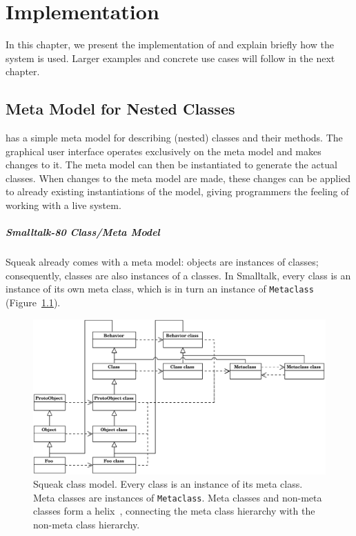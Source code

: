 \chapter{Implementation}
\label{sec:impl}
In this chapter, we present the implementation of \msname and explain briefly how the system is used. Larger examples and concrete use cases will follow in the next chapter.

\section{Meta Model for Nested Classes}
\label{sec:impl_meta_model}
\msname has a simple meta model for describing (nested) classes and their methods. The graphical user interface operates exclusively on the meta model and makes changes to it. The meta model can then be instantiated to generate the actual classes. When changes to the meta model are made, these changes can be applied to already existing instantiations of the model, giving programmers the feeling of working with a live system.

\paragraph{Smalltalk-80 Class/Meta Model}
Squeak already comes with a meta model: objects are instances of classes; consequently, classes are also instances of a classes. In Smalltalk, every class is an instance of its own meta class, which is in turn an instance of \texttt{Metaclass} (Figure~\ref{fig:impl_squeak_meta}).

\begin{figure}
	\includegraphics[width=\textwidth]{squeak_meta.pdf}
	\centering
	\caption[Squeak class model]{Squeak class model. Every class is an instance of its meta class. Meta classes are instances of \texttt{Metaclass}. Meta classes and non-meta classes form a helix~\cite{Briot:1989:PEM:74877.74921}, connecting the meta class hierarchy with the non-meta class hierarchy.}
	\label{fig:impl_squeak_meta}
\end{figure}

